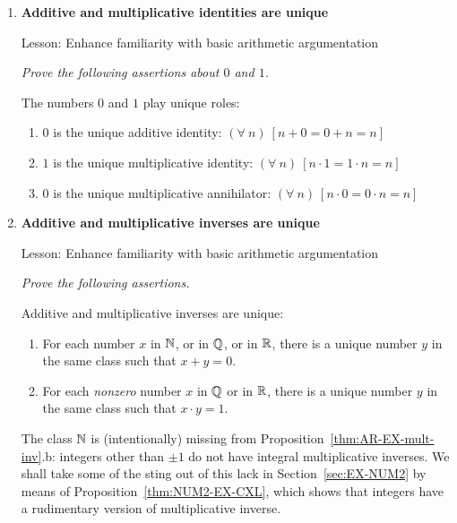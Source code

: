 \begin{enumerate}
\item
{\bf Additive and multiplicative identities are unique}

{\sc Lesson:} Enhance familiarity with basic arithmetic argumentation

\smallskip  

{\em Prove the following assertions about $0$ and $1$.}

\begin{prop}
The numbers $0$ and $1$ play unique roles:
\begin{enumerate}
\item
$0$ is the unique additive identity: $(\forall \ n) \ [n+0 = 0 + n = n]$
\medskip\item 
$1$ is the unique multiplicative identity: $(\forall \ n) \ [n \cdot 1 = 1 \cdot n = n]$
\medskip\item
$0$ is the unique multiplicative annihilator: $(\forall \ n) \ [n \cdot 0 = 0 \cdot n = n]$
\end{enumerate}
\end{prop}

\medskip\item
{\bf Additive and multiplicative inverses are unique}

{\sc Lesson:} Enhance familiarity with basic arithmetic argumentation

\smallskip  

{\em Prove the following assertions.}

\begin{prop}
\label{thm:AR-EX-mult-inv}
Additive and multiplicative inverses are unique:
\begin{enumerate}
\item
For each number $x$ in $\mathbb{N}$, or in $\mathbb{Q}$, or in $\mathbb{R}$, there is a unique number $y$ in the same class such that $x + y = 0$.
\medskip\item 
For each {\em nonzero} number $x$ in $\mathbb{Q}$ or in $\mathbb{R}$, there is a unique number $y$ in the same class such that $x \cdot y = 1$.
\end{enumerate}
\end{prop}

The class $\mathbb{N}$ is (intentionally) missing from Proposition~\ref{thm:AR-EX-mult-inv}.b: integers other than $\pm 1$ do not have integral multiplicative inverses.  We shall take some of the sting out of this lack in 
Section~\ref{sec:EX-NUM2} by means of Proposition~\ref{thm:NUM2-EX-CXL}, which shows that integers have a rudimentary version of multiplicative inverse.
\medskip


\end{enumerate}
